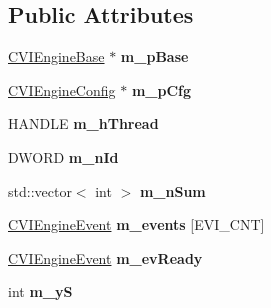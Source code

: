 \subsection*{Public Attributes}
\begin{DoxyCompactItemize}
\item 
\hypertarget{class_c_v_i_engine_thread_a771ad7767cb35813f6671f497b075496}{\hyperlink{class_c_v_i_engine_base}{C\+V\+I\+Engine\+Base} $\ast$ {\bfseries m\+\_\+p\+Base}}\label{class_c_v_i_engine_thread_a771ad7767cb35813f6671f497b075496}

\item 
\hypertarget{class_c_v_i_engine_thread_ac297ce260db221d74422e3c7e8e03e27}{\hyperlink{class_c_v_i_engine_config}{C\+V\+I\+Engine\+Config} $\ast$ {\bfseries m\+\_\+p\+Cfg}}\label{class_c_v_i_engine_thread_ac297ce260db221d74422e3c7e8e03e27}

\item 
\hypertarget{class_c_v_i_engine_thread_a1ac54d72e0fe75fff96d82b115df962c}{H\+A\+N\+D\+L\+E {\bfseries m\+\_\+h\+Thread}}\label{class_c_v_i_engine_thread_a1ac54d72e0fe75fff96d82b115df962c}

\item 
\hypertarget{class_c_v_i_engine_thread_a9cc3627d5a28cc22d6e33cdb052a7f4d}{D\+W\+O\+R\+D {\bfseries m\+\_\+n\+Id}}\label{class_c_v_i_engine_thread_a9cc3627d5a28cc22d6e33cdb052a7f4d}

\item 
\hypertarget{class_c_v_i_engine_thread_a8b580461aa6df1676e9e31b2a46bcc7e}{std\+::vector$<$ int $>$ {\bfseries m\+\_\+n\+Sum}}\label{class_c_v_i_engine_thread_a8b580461aa6df1676e9e31b2a46bcc7e}

\item 
\hypertarget{class_c_v_i_engine_thread_a6c0ce9aab9b56cdd97087404af92fbb0}{\hyperlink{class_c_v_i_engine_event}{C\+V\+I\+Engine\+Event} {\bfseries m\+\_\+events} \mbox{[}E\+V\+I\+\_\+\+C\+N\+T\mbox{]}}\label{class_c_v_i_engine_thread_a6c0ce9aab9b56cdd97087404af92fbb0}

\item 
\hypertarget{class_c_v_i_engine_thread_af84f80046cb905dda7623ef8a2ea956b}{\hyperlink{class_c_v_i_engine_event}{C\+V\+I\+Engine\+Event} {\bfseries m\+\_\+ev\+Ready}}\label{class_c_v_i_engine_thread_af84f80046cb905dda7623ef8a2ea956b}

\item 
\hypertarget{class_c_v_i_engine_thread_a19834ce7dacd0ff5d1cc4615c040830c}{int {\bfseries m\+\_\+y\+S}}\label{class_c_v_i_engine_thread_a19834ce7dacd0ff5d1cc4615c040830c}


\end{DoxyCompactItemize}
